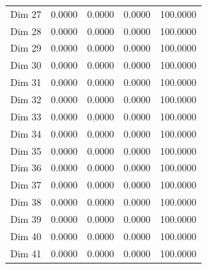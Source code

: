 \begin{table}[H]
\begin{tabular}{|c|c|c|c|c|}
Dim 27 & 0.0000 & 0.0000 & 0.0000 & 100.0000 \\
Dim 28 & 0.0000 & 0.0000 & 0.0000 & 100.0000 \\
Dim 29 & 0.0000 & 0.0000 & 0.0000 & 100.0000 \\
Dim 30 & 0.0000 & 0.0000 & 0.0000 & 100.0000 \\
Dim 31 & 0.0000 & 0.0000 & 0.0000 & 100.0000 \\
Dim 32 & 0.0000 & 0.0000 & 0.0000 & 100.0000 \\
Dim 33 & 0.0000 & 0.0000 & 0.0000 & 100.0000 \\
Dim 34 & 0.0000 & 0.0000 & 0.0000 & 100.0000 \\
Dim 35 & 0.0000 & 0.0000 & 0.0000 & 100.0000 \\
Dim 36 & 0.0000 & 0.0000 & 0.0000 & 100.0000 \\
Dim 37 & 0.0000 & 0.0000 & 0.0000 & 100.0000 \\
Dim 38 & 0.0000 & 0.0000 & 0.0000 & 100.0000 \\
Dim 39 & 0.0000 & 0.0000 & 0.0000 & 100.0000 \\
Dim 40 & 0.0000 & 0.0000 & 0.0000 & 100.0000 \\
Dim 41 & 0.0000 & 0.0000 & 0.0000 & 100.0000 \\
\hline
\end{tabular}
\end{table}